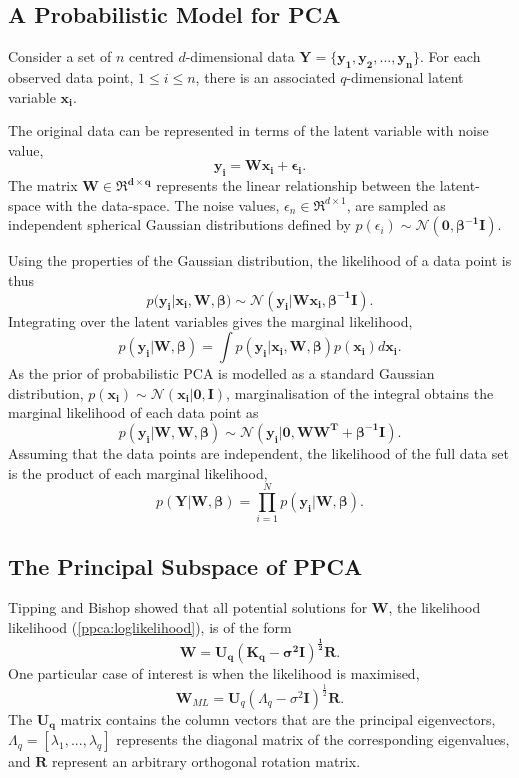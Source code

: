 \documentclass[ %
                    author={Dillon Keith Diep [INCOMPLETE DRAFT, NOT FOR SUBMISSION]},
                supervisor={Dr. Carl Henrik Ek},
                    degree={MEng},
                     title={ARt-CG:},
                  subtitle={Assisted Real-time Content Generation of 3D Hair by Learning Manifolds},
                      type={Research},
                      year={2014} ]{dissertation}
\begin{document}
\subsection{A Probabilistic Model for PCA}
Consider a set of $n$ centred $d$-dimensional data $\mathbf{Y=\{y_1,y_2,...,y_n\}}$.
For each observed data point, $1 \leq i \leq n $, there is an associated $q$-dimensional latent variable $\mathbf{x_i}$.

The original data can be represented in terms of the latent variable with noise value,
$$\mathbf{y_i=Wx_i+\epsilon_i}.$$
The matrix $\mathbf{W \in \Re^{d \times q}}$ represents the linear relationship between the latent-space with the  data-space. The noise values, $\epsilon_n \in \Re^{d \times 1}$, are sampled as independent spherical Gaussian distributions defined by $p(\epsilon_i)\sim\mathcal{N}(\mathbf{0, \beta^{-1}I})$.

{ \color{red}
Using the properties of the Gaussian distribution, the likelihood of a data point is thus
}
\begin{equation} \label{ppca:likelihood}
p(\mathbf{y_i|x_i,W,\beta)\sim\mathcal{N}(y_i|Wx_i,\beta^{-1}I)}.
\end{equation}
Integrating over the latent variables gives the marginal likelihood,
$$p(\mathbf{y_i|W,\beta})=\int p(\mathbf{y_i|x_i,W,\beta})p(\mathbf{x_i})d\mathbf{x_i}.$$
As the prior of probabilistic PCA is modelled as a standard Gaussian distribution, $p(\mathbf{x_i})\sim\mathcal{N}(\mathbf{x_i|0,I})$,
marginalisation of the integral obtains the marginal likelihood of each data point as
$$p(\mathbf{y_i|W,W,\beta})\sim\mathcal{N}(\mathbf{y_i|0,WW^T+\beta^{-1}I}).$$
Assuming that the data points are independent, the likelihood of the full data set is the product of each marginal likelihood,
$$p(\mathbf{Y|W,\beta})=\prod^N_{i=1} p(\mathbf{y_i|W,\beta}).$$

\subsection{The Principal Subspace of PPCA}
Tipping and Bishop\cite{ppca} showed that all potential solutions for $\mathbf{W}$, the likelihood likelihood (\ref{ppca:loglikelihood}), is of the form $$\mathbf{W=U_q(K_q-\sigma^2I)^\frac{1}{2}R}.$$
One particular case of interest is when the likelihood is maximised,
\begin{equation} \label{ppca:ml}
	\mathbf{W}_{ML}=\mathbf{U}_q(\Lambda_q-\sigma^2\mathbf{I})^{\frac{1}{2}}\mathbf{R}.
\end{equation}
The $\mathbf{U_q}$ matrix contains the column vectors that are the principal eigenvectors, $\Lambda_q=[\lambda_1,...,\lambda_q]$ represents the diagonal matrix of the corresponding eigenvalues, and $\mathbf{R}$ represent an arbitrary orthogonal rotation matrix. 
\end{document}
